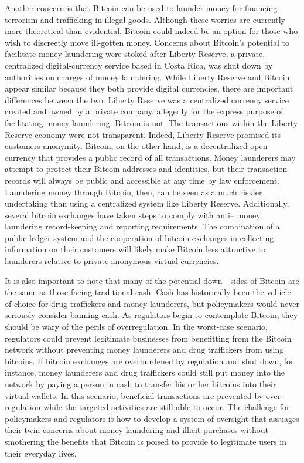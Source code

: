 Another concern is that Bitcoin can be used to launder money
for financing terrorism and trafficking in illegal goods. Although
these worries are currently more theoretical than evidential,
Bitcoin could indeed be an option for those who wish to discreetly
move ill-gotten money. Concerns about Bitcoin’s potential to
facilitate money laundering were stoked after Liberty Reserve, a
private, centralized digital-currency service based in Costa Rica,
was shut down by authorities on charges of money laundering.
While Liberty Reserve and Bitcoin appear similar because they
both provide digital currencies, there are important differences
between the two. Liberty Reserve was a centralized currency
service created and owned by a private company, allegedly for
the express purpose of facilitating money laundering. Bitcoin is
not. The transactions within the Liberty Reserve economy were
not transparent. Indeed, Liberty Reserve promised its customers
anonymity. Bitcoin, on the other hand, is a decentralized open
currency that provides a public record of all transactions. Money
launderers may attempt to protect their Bitcoin addresses and
identities, but their transaction records will always be public and
accessible at any time by law enforcement. Laundering money
through Bitcoin, then, can be seen as a much riskier undertaking
than using a centralized system like Liberty Reserve. Additionally, several bitcoin exchanges have taken steps to comply with anti–
money laundering record-keeping and reporting requirements.
The combination of a public ledger system and the cooperation of
bitcoin exchanges in collecting information on their customers
will likely make Bitcoin less attractive to launderers relative to
private anonymous virtual currencies.

It is also important to note that many of the potential down -
sides of Bitcoin are the same as those facing traditional cash.
Cash has historically been the vehicle of choice for drug traffickers
and money launderers, but policymakers would never
seriously consider banning cash. As regulators begin to contemplate
Bitcoin, they should be wary of the perils of overregulation.
In the worst-case scenario, regulators could prevent legitimate
businesses from benefitting from the Bitcoin network without
preventing money launderers and drug traffickers from using
bitcoins. If bitcoin exchanges are overburdened by regulation
and shut down, for instance, money launderers and drug traffickers
could still put money into the network by paying a person
in cash to transfer his or her bitcoins into their virtual wallets.
In this scenario, beneficial transactions are prevented by over -
regulation while the targeted activities are still able to occur.
The challenge for policymakers and regulators is how to develop
a system of oversight that assuages their twin concerns about
money laundering and illicit purchases without smothering the
benefits that Bitcoin is poised to provide to legitimate users in
their everyday lives.

